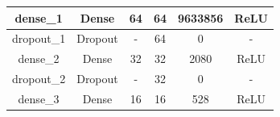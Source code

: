 \begin{table}[]
{\begin{tabular}{@{}cccccc@{}}
            \multicolumn{1}{|c|}{dense\_1}      & \multicolumn{1}{c|}{Dense}         & \multicolumn{1}{c|}{64}                                                                    & \multicolumn{1}{c|}{64}                                                                        & \multicolumn{1}{c|}{9633856}                                                                    & \multicolumn{1}{c|}{ReLU}                                                                      \\ \midrule
            \multicolumn{1}{|c|}{dropout\_1}    & \multicolumn{1}{c|}{Dropout}       & \multicolumn{1}{c|}{-}                                                                     & \multicolumn{1}{c|}{64}                                                                        & \multicolumn{1}{c|}{0}                                                                          & \multicolumn{1}{c|}{-}                                                                         \\ \midrule
            \multicolumn{1}{|c|}{dense\_2}      & \multicolumn{1}{c|}{Dense}         & \multicolumn{1}{c|}{32}                                                                    & \multicolumn{1}{c|}{32}                                                                        & \multicolumn{1}{c|}{2080}                                                                       & \multicolumn{1}{c|}{ReLU}                                                                      \\ \midrule
            \multicolumn{1}{|c|}{dropout\_2}    & \multicolumn{1}{c|}{Dropout}       & \multicolumn{1}{c|}{-}                                                                     & \multicolumn{1}{c|}{32}                                                                        & \multicolumn{1}{c|}{0}                                                                          & \multicolumn{1}{c|}{-}                                                                         \\ \midrule
            \multicolumn{1}{|c|}{dense\_3}      & \multicolumn{1}{c|}{Dense}         & \multicolumn{1}{c|}{16}                                                                    & \multicolumn{1}{c|}{16}                                                                        & \multicolumn{1}{c|}{528}                                                                        & \multicolumn{1}{c|}{ReLU}                                                                      \\ \midrule

\end{tabular}}
\end{table}
